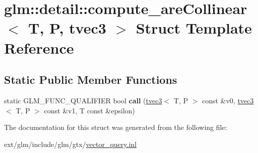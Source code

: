 \hypertarget{structglm_1_1detail_1_1compute__are_collinear_3_01_t_00_01_p_00_01tvec3_01_4}{\section{glm\-:\-:detail\-:\-:compute\-\_\-are\-Collinear$<$ T, P, tvec3 $>$ Struct Template Reference}
\label{structglm_1_1detail_1_1compute__are_collinear_3_01_t_00_01_p_00_01tvec3_01_4}
}
\subsection*{Static Public Member Functions}
\begin{DoxyCompactItemize}
\item 
\hypertarget{structglm_1_1detail_1_1compute__are_collinear_3_01_t_00_01_p_00_01tvec3_01_4_a4a9fce4b46bc6906c0b6b44c31accdb1}{static G\-L\-M\-\_\-\-F\-U\-N\-C\-\_\-\-Q\-U\-A\-L\-I\-F\-I\-E\-R bool {\bfseries call} (\hyperlink{structglm_1_1tvec3}{tvec3}$<$ T, P $>$ const \&v0, \hyperlink{structglm_1_1tvec3}{tvec3}$<$ T, P $>$ const \&v1, T const \&epsilon)}\label{structglm_1_1detail_1_1compute__are_collinear_3_01_t_00_01_p_00_01tvec3_01_4_a4a9fce4b46bc6906c0b6b44c31accdb1}

\end{DoxyCompactItemize}


The documentation for this struct was generated from the following file\-:\begin{DoxyCompactItemize}
\item 
ext/glm/include/glm/gtx/\hyperlink{vector__query_8inl}{vector\-\_\-query.\-inl}\end{DoxyCompactItemize}
